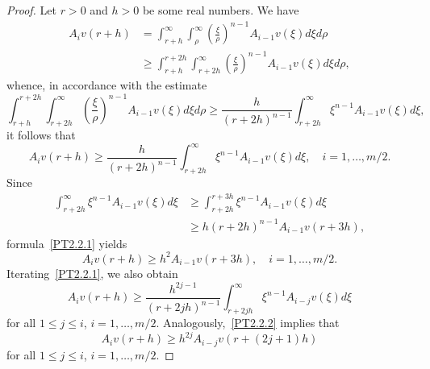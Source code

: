 \documentclass[11pt]{amsart}
\theoremstyle{definition}
\numberwithin{equation}{section}
\begin{document}
\begin{proof}
Let $r > 0$ and $h > 0$ be some real numbers.
We have
\begin{align*}
	A_i v (r + h)
	&
	=
	\int_{r + h}^\infty
	\int_\rho^\infty
	\left(
		\frac{\xi}{\rho}
	\right)^{n - 1}
	A_{i-1} v (\xi)
	d\xi
	d\rho
	\\
	&
	\ge
	\int_{r + h}^{r + 2 h}
	\int_{r + 2 h}^\infty
	\left(
		\frac{\xi}{\rho}
	\right)^{n - 1}
	A_{i-1} v (\xi)
	d\xi
	d\rho,
\end{align*}
whence, in accordance with the estimate
$$
	\int_{r + h}^{r + 2 h}
	\int_{r + 2 h}^\infty
	\left(
		\frac{\xi}{\rho}
	\right)^{n - 1}
	A_{i-1} v (\xi)
	d\xi
	d\rho
	\ge
	\frac{
		h
	}{
		(r + 2 h)^{n - 1}
	}
	\int_{r + 2 h}^\infty
	\xi^{n - 1}
	A_{i-1} v (\xi)
	d\xi,
$$
it follows that
\begin{equation}
	A_i v (r + h)
	\ge
	\frac{
		h
	}{
		(r + 2 h)^{n - 1}
	}
	\int_{r + 2 h}^\infty
	\xi^{n - 1}
	A_{i-1} v (\xi)
	d\xi,
	\quad
	i = 1, \ldots, m / 2.
	\label{PT2.2.1}
\end{equation}
Since
\begin{align*}
	\int_{r + 2 h}^\infty
	\xi^{n - 1}
	A_{i-1} v (\xi)
	d\xi
	&
	{}
	\ge
	\int_{r + 2 h}^{r + 3 h}
	\xi^{n - 1}
	A_{i-1} v (\xi)
	d\xi
	\\
	&
	{}
	\ge
	h
	(r + 2 h)^{n - 1}
	A_{i-1} v (r + 3 h),
\end{align*}
formula~\eqref{PT2.2.1} yields
\begin{equation}
	A_i v (r + h)
	\ge
	h^2
	A_{i - 1} v (r + 3 h),
	\quad
	i = 1, \ldots, m / 2.
	\label{PT2.2.2}
\end{equation}
Iterating~\eqref{PT2.2.1}, we also obtain
\begin{equation}
	A_i v (r + h)
	\ge
	\frac{
		h^{2 j - 1}
	}{
		(r + 2 j h)^{n - 1}
	}
	\int_{r + 2 j h}^\infty
	\xi^{n - 1}
	A_{i - j} v (\xi)
	d\xi
	\label{PT2.2.3}
\end{equation}
for all $1 \le j \le i$, $	i = 1, \ldots, m / 2$.
Analogously,~\eqref{PT2.2.2} implies that
\begin{equation}
	A_i v (r + h)
	\ge
	h^{2 j}
	A_{i - j} v (r + (2j + 1) h)
	\label{PT2.2.4}
\end{equation}
for all $1 \le j \le i$, $	i = 1, \ldots, m / 2$.


\end{proof}
\end{document}
